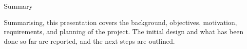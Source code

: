 \begin{frame}{Summary}

Summarising, this presentation covers the background, objectives, motivation, requirements, and planning of the project. The initial design and what has been done so far are reported, and the next steps are outlined.

\end{frame}
